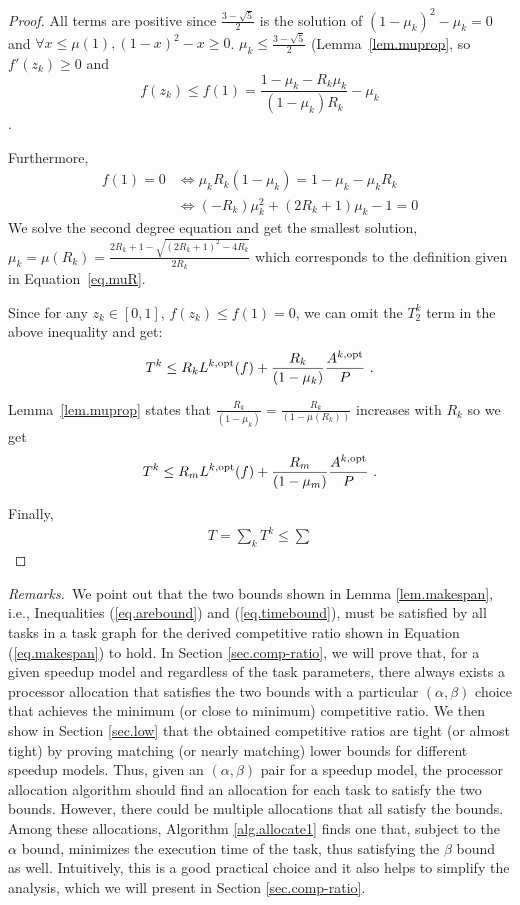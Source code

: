 \documentclass{article}
\newcommand\ratio{R\xspace}
\newcommand\opt{\textnormal{opt}\xspace}
\newcommand{\LP}[2][inline]{\todo[color=green!50,#1]{\sf \textbf{Lucas:} #2}
\xspace}
\begin{document}
\begin{proof}
All terms are positive since $\frac{3-\sqrt{5}}{2}$ is the solution of $(1-\mu_k)^2-\mu_k=0$ and $\forall x \leq \mu(1), (1-x)^2-x \geq 0$. $\mu_k \leq \frac{3-\sqrt{5}}{2}$ (Lemma~\ref{lem.muprop}, so $f'(z_k) \geq 0$ and $$f(z_k) \leq f(1) =\frac{1-\mu_k-\ratio_k\mu_k}{(1-\mu_k)\ratio_k}-\mu_k$$.
\LP{TODO : uniformiser $\mu_k\ratio_k$ (dans cet ordre)}
Furthermore,
\begin{align*}
f(1)=0 &\Leftrightarrow \mu_k\ratio_k(1-\mu_k)=1-\mu_k-\mu_k\ratio_k \\
&\Leftrightarrow (-\ratio_k) \mu_k^2 +(2\ratio_k+1)\mu_k-1=0
\end{align*}
We solve the second degree equation and get the smallest solution, $\mu_k=\mu(\ratio_k)=\frac{2\ratio_k+1-\sqrt{(2\ratio_k+1)^2-4\ratio_k}}{2\ratio_k}$ which corresponds to the definition given in Equation~\ref{eq.muR}.




Since for any $z_{k}\in [0, 1]$, $f(z_k) \leq f(1) = 0$, we can omit the $T_2^{k}$ term in the above inequality and get:
\begin{align*}
T^{k}\leq \ratio_k L^{k,\opt}(f)+\frac{\ratio_k}{(1-\mu_k)}\frac{A^{k,\opt}}{P} \ .
\end{align*}

Lemma~\ref{lem.muprop} states that $\frac{\ratio_k}{(1-\mu_k)}=\frac{\ratio_k}{(1-\mu(\ratio_k))}$ increases with $\ratio_k$ so we get
$$ T^{k}\leq \ratio_m L^{k,\opt}(f)+\frac{\ratio_m}{(1-\mu_m)}\frac{A^{k,\opt}}{P} \ . $$

Finally, 
\begin{align*}
 T=\sum_k T^k \leq \sum
\end{align*}

\end{proof}

\emph{Remarks.}~We point out that the two bounds shown in Lemma \ref{lem.makespan}, i.e., Inequalities (\ref{eq.arebound}) and (\ref{eq.timebound}), must be satisfied by all tasks in a task graph for the derived competitive ratio shown in Equation (\ref{eq.makespan}) to hold. In Section \ref{sec.comp-ratio}, we will prove that, for a given speedup model and regardless of the task parameters, there always exists a processor allocation that satisfies the two bounds with a particular $(\alpha, \beta)$ choice that achieves the minimum (or close to minimum) competitive ratio. We then show in Section \ref{sec.low} that the obtained competitive ratios are tight (or almost tight) by proving matching (or nearly matching) lower bounds for different speedup models.
Thus, given an $(\alpha, \beta)$ pair for a speedup model, the processor allocation algorithm should find an allocation for each task to satisfy the two bounds. However, there could be multiple allocations that all satisfy the bounds. Among these allocations, Algorithm \ref{alg.allocate1} finds one that, subject to the $\alpha$ bound, minimizes the execution time of the task, thus satisfying the $\beta$ bound as well. Intuitively, this is a good practical choice and it also helps to simplify the analysis, which we will present in Section \ref{sec.comp-ratio}.
\end{document}
